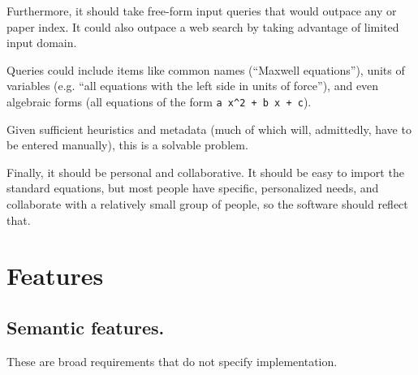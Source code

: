 \documentclass[12pt,letterpaper]{article}
\begin{document}
Furthermore,
it should take free-form input queries that would outpace any or paper index.
It could also outpace a web search by taking advantage of limited input domain.

Queries could include items like common names (``Maxwell equations''),
units of variables
(e.g. ``all equations with the left side in units of force''),
and even algebraic forms (all equations of the form \verb|a x^2 + b x + c|).

Given sufficient heuristics and metadata
(much of which will, admittedly, have to be entered manually),
this is a solvable problem.

Finally, it should be personal and collaborative.
It should be easy to import the standard equations,
but most people have specific, personalized needs,
and collaborate with a relatively small group of people,
so the software should reflect that.

\section{Features}\label{sec:features}

\subsection{Semantic features.}

These are broad requirements that do not specify implementation.
\end{document}
